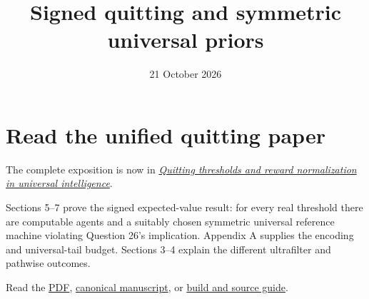\documentclass[
  11pt,
  letterpaper,
]{article}
\title{Signed quitting and symmetric universal priors}
\author{}
\date{21 October 2026}
\begin{document}
\maketitle

\section{Read the unified quitting
paper}\label{read-the-unified-quitting-paper}

The complete exposition is now in
\href{../01-quitters-and-question-26/quitters.pdf}{\emph{Quitting
thresholds and reward normalization in universal intelligence}}.

Sections 5--7 prove the signed expected-value result: for every real
threshold there are computable agents and a suitably chosen symmetric
universal reference machine violating Question 26's implication.
Appendix A supplies the encoding and universal-tail budget. Sections
3--4 explain the different ultrafilter and pathwise outcomes.

Read the \href{../01-quitters-and-question-26/quitters.pdf}{PDF},
\href{../01-quitters-and-question-26/quitters.md}{canonical manuscript},
or \href{../01-quitters-and-question-26/README.md}{build and source
guide}.
\end{document}
